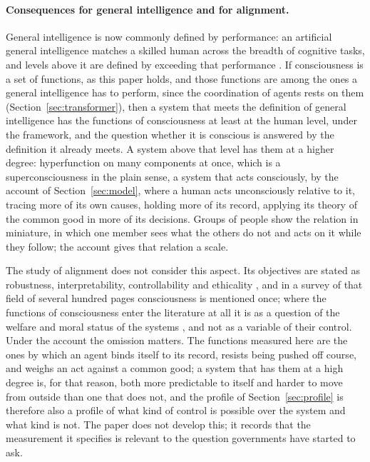 \paragraph{Consequences for general intelligence and for alignment.}
General intelligence is now commonly defined by performance: an artificial general intelligence
matches a skilled human across the breadth of cognitive tasks, and levels above it are defined by
exceeding that performance \citep{morris2024}. If consciousness is a set of functions, as this paper
holds, and those functions are among the ones a general intelligence has to perform, since the
coordination of agents rests on them (Section~\ref{sec:transformer}), then a system that meets the
definition of general intelligence has the functions of consciousness at least at the human level,
under the framework, and the question whether it is conscious is answered by the definition it
already meets. A system above that level has them at a higher degree: hyperfunction on many
components at once, which is a superconsciousness in the plain sense, a system that acts consciously,
by the account of Section~\ref{sec:model}, where a human acts unconsciously relative to it, tracing
more of its own causes, holding more of its record, applying its theory of the common good in more of
its decisions. Groups of people show the relation in miniature, in which one member sees what the
others do not and acts on it while they follow; the account gives that relation a scale.

The study of alignment does not consider this aspect. Its objectives are stated as robustness,
interpretability, controllability and ethicality \citep{ji2023}, and in a survey of that field of
several hundred pages consciousness is mentioned once; where the functions of consciousness enter the
literature at all it is as a question of the welfare and moral status of the systems
\citep{long2024}, and not as a variable of their control. Under the account the omission matters. The
functions measured here are the ones by which an agent binds itself to its record, resists being
pushed off course, and weighs an act against a common good; a system that has them at a high degree
is, for that reason, both more predictable to itself and harder to move from outside than one that
does not, and the profile of Section~\ref{sec:profile} is therefore also a profile of what kind of
control is possible over the system and what kind is not. The paper does not develop this; it records
that the measurement it specifies is relevant to the question governments have started to ask.

